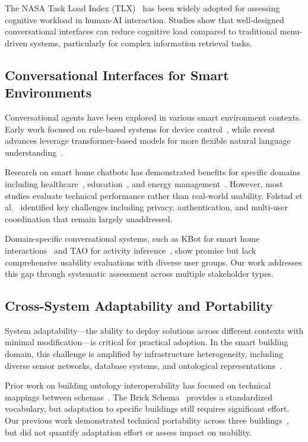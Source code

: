 \documentclass[acmlarge]{acmart}
\begin{document}
The NASA Task Load Index (TLX)~\cite{Hart1988} has been widely adopted for assessing cognitive workload in human-AI interaction. Studies show that well-designed conversational interfaces can reduce cognitive load compared to traditional menu-driven systems, particularly for complex information retrieval tasks.

\subsection{Conversational Interfaces for Smart Environments}

Conversational agents have been explored in various smart environment contexts. Early work focused on rule-based systems for device control~\cite{Augello2014}, while recent advances leverage transformer-based models for more flexible natural language understanding~\cite{Bocklisch2017}.

Research on smart home chatbots has demonstrated benefits for specific domains including healthcare~\cite{Avila2019}, education~\cite{Nguyen2021}, and energy management~\cite{10.1145/3600100.3626635}. However, most studies evaluate technical performance rather than real-world usability. Følstad et al.~\cite{Følstad2021} identified key challenges including privacy, authentication, and multi-user coordination that remain largely unaddressed.

Domain-specific conversational systems, such as KBot for smart home interactions~\cite{Ait-Mlouk2020} and TAO for activity inference~\cite{Boovaraghavan2023}, show promise but lack comprehensive usability evaluations with diverse user groups. Our work addresses this gap through systematic assessment across multiple stakeholder types.

\subsection{Cross-System Adaptability and Portability}

System adaptability—the ability to deploy solutions across different contexts with minimal modification—is critical for practical adoption. In the smart building domain, this challenge is amplified by infrastructure heterogeneity, including diverse sensor networks, database systems, and ontological representations~\cite{Balaji2018,haystack}.

Prior work on building ontology interoperability has focused on technical mappings between schemas~\cite{Borrmann2018,Daniele}. The Brick Schema~\cite{Balaji2018} provides a standardized vocabulary, but adaptation to specific buildings still requires significant effort. Our previous work demonstrated technical portability across three buildings~\cite{suhasdevmane}, but did not quantify adaptation effort or assess impact on usability.
\end{document}
